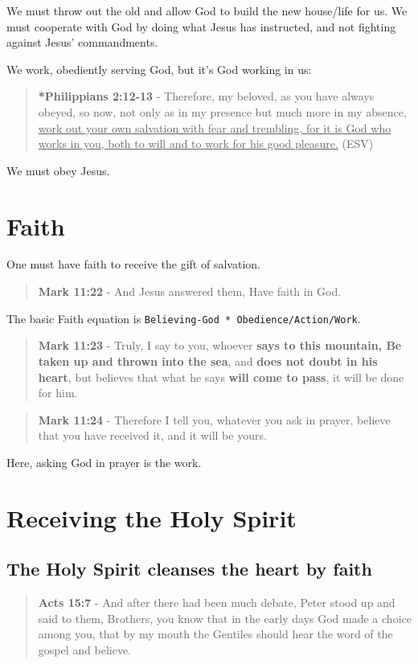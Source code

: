 \documentclass[11pt]{article}
\begin{document}
We must throw out the old and allow God to build the new house/life for us.
We must cooperate with God by doing what Jesus has instructed, and not fighting against Jesus' commandments.

We work, obediently serving God, but it's God working in us:

\begin{quote}
\textbf{*Philippians 2:12-13} - Therefore, my beloved, as you have always obeyed, so now, not only as in my presence but much more in my absence, \uline{work out your own salvation with fear and trembling, for it is God who works in you, both to will and to work for his good pleasure.} (ESV)
\end{quote}

We must obey Jesus.

\section{Faith}
\label{sec:org7422ad5}
One must have faith to receive the gift of salvation.

\begin{quote}
\textbf{Mark 11:22} - And Jesus answered them, Have faith in God.
\end{quote}

The basic Faith equation is \texttt{Believing-God * Obedience/Action/Work}.

\begin{quote}
\textbf{Mark 11:23} - Truly, I say to you, whoever \textbf{says to this mountain, Be taken up and thrown into the sea}, and \textbf{does not doubt in his heart}, but believes that what he says \textbf{will come to pass}, it will be done for him.
\end{quote}

\begin{quote}
\textbf{Mark 11:24} - Therefore I tell you, whatever you ask in prayer, believe that you have received it, and it will be yours.
\end{quote}

Here, asking God in prayer is the work.

\section{Receiving the Holy Spirit}
\label{sec:org6c5ac14}
\subsection{The Holy Spirit cleanses the heart by faith}
\label{sec:org1e17f30}
\begin{quote}
\textbf{Acts 15:7} - And after there had been much debate, Peter stood up and said to them, Brothers, you know that in the early days God made a choice among you, that by my mouth the Gentiles should hear the word of the gospel and believe.
\end{quote}
\end{document}
